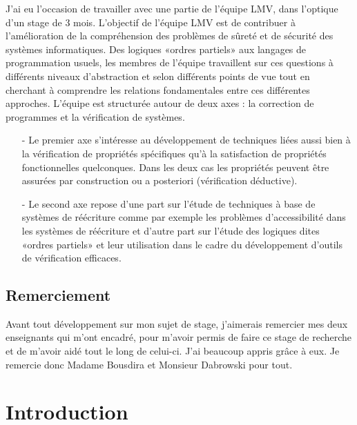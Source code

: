 \documentclass[10pt,a4paper]{report}
\begin{document}
	J'ai eu l'occasion de travailler avec une partie de l'équipe LMV, dans l'optique d'un stage de 3 mois.
	L'objectif de l'équipe LMV est de contribuer à l'amélioration de la compréhension des problèmes de sûreté et de sécurité des systèmes  informatiques. Des logiques «ordres partiels» aux langages de programmation usuels, les membres de l'équipe travaillent sur ces questions à différents niveaux d'abstraction et selon différents points de vue tout en cherchant à comprendre les relations fondamentales entre ces différentes approches. L'équipe est structurée autour de deux axes : la correction de programmes et la vérification de systèmes.
	\begin{enumerate}
		\item[-] Le premier axe s'intéresse au développement de techniques liées aussi bien à la vérification de propriétés spécifiques qu'à la satisfaction de propriétés fonctionnelles quelconques. Dans les deux cas les propriétés peuvent être assurées par construction ou a posteriori (vérification déductive).
		\item[-] Le second axe repose d'une part sur l'étude de techniques à base de systèmes de réécriture comme par exemple les problèmes d'accessibilité dans les systèmes de réécriture et d'autre part sur l'étude des logiques dites «ordres partiels» et leur utilisation dans le cadre du développement d'outils de vérification efficaces.
	\end{enumerate}
	
	\vfill
	
	\section*{Remerciement}
	Avant tout développement sur mon sujet de stage, j'aimerais remercier mes deux enseignants qui m'ont encadré, pour m'avoir permis de faire ce stage de recherche et de m'avoir aidé tout le long de celui-ci. J'ai beaucoup appris grâce à eux. Je remercie donc Madame Bousdira et Monsieur Dabrowski pour tout.
	
	
	\chapter{Introduction}
	
\end{document}

